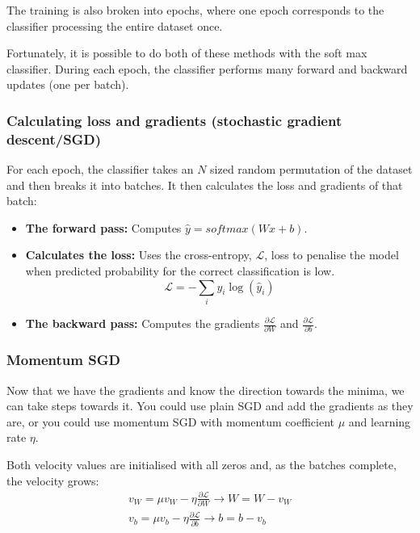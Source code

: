 \documentclass[10pt]{article}
\begin{document}
\begin{flushleft}
    
    The training is also broken into epochs, where one epoch corresponds to the classifier processing the
    entire dataset once.

    
    Fortunately, it is possible to do both of these methods with the soft max classifier.
    During each epoch, the classifier performs many forward and backward updates (one per batch).

    \subsubsection{Calculating loss and gradients (stochastic gradient descent/SGD)}

    For each epoch, the classifier takes an $N$ sized random permutation of the dataset and then breaks it into
    batches.
    It then calculates the loss and gradients of that batch:

    \begin{itemize}
        \item \textbf{The forward pass:} Computes $\hat{y} = softmax(Wx + b)$.
        \item \textbf{Calculates the loss:} Uses the cross-entropy, $\mathcal{L}$, loss to penalise the model when predicted probability
        for the correct classification is low.
        \[
            \mathcal{L} = -\sum_{i}{ y_{i} \log( \hat{y}_{i} ) }
        \]
        \item \textbf{The backward pass:} Computes the gradients $\frac{\partial \mathcal{L}}{\partial W}$ and $\frac{\partial \mathcal{L}}{\partial b}$.
    \end{itemize}

    \subsubsection{Momentum SGD}

    Now that we have the gradients and know the direction towards the minima, we can take steps towards it.
    You could use plain SGD and add the gradients as they are, or you could use momentum SGD with
    momentum coefficient $\mu$ and learning rate $\eta$.
    
    Both velocity values are initialised with all zeros and, as the batches complete, the velocity grows:
    \begin{gather*}
        v_{W} = \mu v_{W} - \eta \frac{\partial \mathcal{L}}{\partial W} \longrightarrow W = W - v_{W}\\
        v_{b} = \mu v_{b} - \eta \frac{\partial \mathcal{L}}{\partial b} \longrightarrow b = b - v_{b}\\
    \end{gather*}
    

\end{flushleft}
\end{document}
